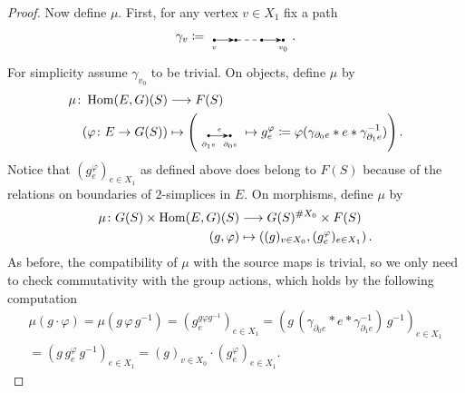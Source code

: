 \begin{proof}
Now define $\mu$. First, for any vertex $v \in X_1$ fix a path
\begin{equation}
\gamma_v \coloneqq 
\begin{tikzpicture}[baseline={(v.center)}, xscale=0.6, yscale=1]
    \tikzset{dot/.style={circle, fill, inner sep=0.8pt}}
    \node[dot, label=below:{\tiny $v$}] (v) at (0,0) {};
    \node[dot] (v1) at (1,0) {};
    \node[dot] (vn) at (2.2,0) {};
    \node[dot, label=below:{\tiny $v_0$}] (v0) at (3.2,0) {};
    \draw[-{Stealth}] (v) -- (v1);
    \draw[dashed] (v1) -- (vn);
    \draw[-{Stealth}] (vn) -- (v0);
\end{tikzpicture}.
\end{equation}
For simplicity assume $\gamma_{v_0}$ to be trivial. On objects, define $\mu$ by
\begin{align}
\mu\colon \Hom(E, G)(S) &\longrightarrow F(S) \\
(\varphi\colon E \to G(S)) &\mapsto \left(
\begin{tikzpicture}[baseline={(v.center)}, xscale=0.6, yscale=1]
    \tikzset{dot/.style={circle, fill, inner sep=0.8pt}}
    \node[dot, label=below:{\tiny $\partial_1 e$}] (v) at (0,0) {};
    \node[dot, label=below:{\tiny $\partial_0 e$}] (v') at (1,0) {};
    \draw[-{Stealth}] (v) -- node[above] {\tiny $e$} (v');
\end{tikzpicture}
\mapsto g_e^{\varphi} \coloneqq \varphi (\gamma_{\partial_0 e} * e * \gamma_{\partial_1 e}^{-1})
\right).
\end{align}
Notice that $(g_e^{\varphi})_{e \in X_1}$ as defined above does belong to $F(S)$ because of the relations on boundaries of $2$-simplices in $E$. On morphisms, define $\mu$ by
\begin{align}
\mu \colon G(S) \times \operatorname{Hom}(E, G)(S) &\longrightarrow G(S)^{\# X_0} \times F(S) \\
(g, \varphi) & \mapsto \left((g)_{v \in X_0}, (g_e^{\varphi})_{e \in X_1}\right).
\end{align}
As before, the compatibility of $\mu$ with the source maps is trivial, so we only need to check commutativity with the group actions, which holds by the following computation
\begin{multline}
\mu(g \cdot \varphi) = \mu(g \, \varphi \, g^{-1}) = (g_e^{g \varphi g^{-1}})_{e \in X_1} = (g \, (\gamma_{\partial_0 e} * e * \gamma_{\partial_1 e}^{-1}) \, g ^{-1})_{e \in X_1} \\
= (g \, g_e^{\varphi} \, g^{-1})_{e \in X_1} = (g)_{v \in X_0} \cdot (g_e^{\varphi})_{e \in X_1}.
\end{multline}


\end{proof}
